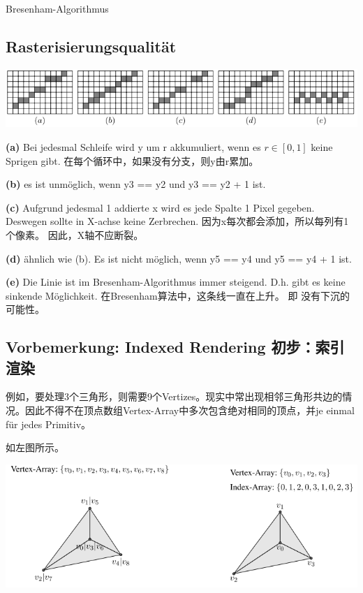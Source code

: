 \documentclass[fleqn]{article}
\begin{document}
\indent\indent Bresenham-Algorithmus


\subsection{Rasterisierungsqualität}

\begin{center}
    \includegraphics[scale=0.5]{2.png}
\end{center}

\textbf{(a)} Bei jedesmal Schleife wird y um r akkumuliert, wenn es $r\in[0,1]$ keine Sprigen gibt.
在每个循环中，如果没有分支，则y由r累加。

\textbf{(b)} es ist unmöglich, wenn y3 == y2 und y3 == y2 + 1 ist.

\textbf{(c)} Aufgrund jedesmal 1 addierte x wird es jede Spalte 1 Pixel gegeben. Deswegen sollte in X-achse keine Zerbrechen. 
因为x每次都会添加，所以每列有1个像素。 因此，X轴不应断裂。

\textbf{(d)} ähnlich wie (b). Es ist nicht möglich, wenn y5 == y4 und y5 == y4 + 1 ist.

\textbf{(e)} Die Linie ist im Bresenham-Algorithmus immer steigend. D.h. gibt es keine sinkende Möglichkeit.
在Bresenham算法中，这条线一直在上升。 即 没有下沉的可能性。


\subsection{Vorbemerkung: Indexed Rendering 初步：索引渲染}

例如，要处理3个三角形，则需要9个Vertizes。现实中常出现相邻三角形共边的情况。因此不得不在顶点数组Vertex-Array中多次包含绝对相同的顶点，并je einmal für jedes Primitiv。

如左图所示。

\begin{center}
    \includegraphics[scale=0.6]{4.png}
\end{center}
\end{document}
